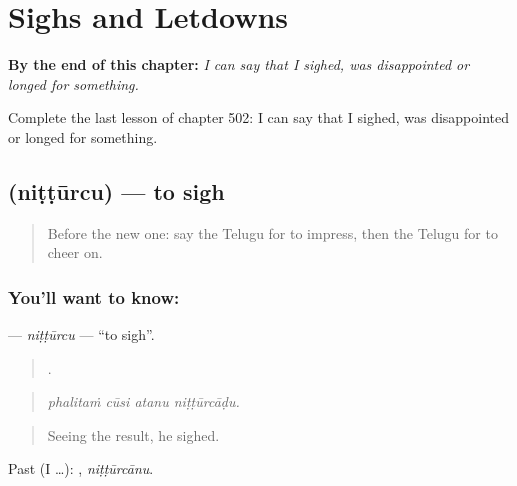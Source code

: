 
\chapter{Sighs and Letdowns}
\label{ch:te-sighs-and-letdowns}

\begin{chapteropening}
\textbf{By the end of this chapter:} \emph{I can say that I sighed, was disappointed or longed for something.}

Complete the last lesson of chapter 502: I can say that I sighed, was disappointed or longed for something.
\end{chapteropening}

\section[\texorpdfstring{\te{నిట్టూర్చు} (niṭṭūrcu)}{నిట్టూర్చు (niṭṭūrcu)}]{ (niṭṭūrcu) — to sigh}

\label{lesson:TE-C502-nitturcu}



\begin{quote}
Before the new one: say the Telugu for to impress, then the Telugu for to cheer on.
\end{quote}

\subsection*{You'll want to know: }
\textbf{} — \emph{niṭṭūrcu} — \textquotedblleft{}to sigh\textquotedblright{}.

\begin{quote}
   .
\end{quote}

\begin{quote}
\emph{phalitaṁ cūsi atanu niṭṭūrcāḍu.}
\end{quote}

\begin{quote}
Seeing the result, he sighed.
\end{quote}

Past (I …): , \emph{niṭṭūrcānu}.

